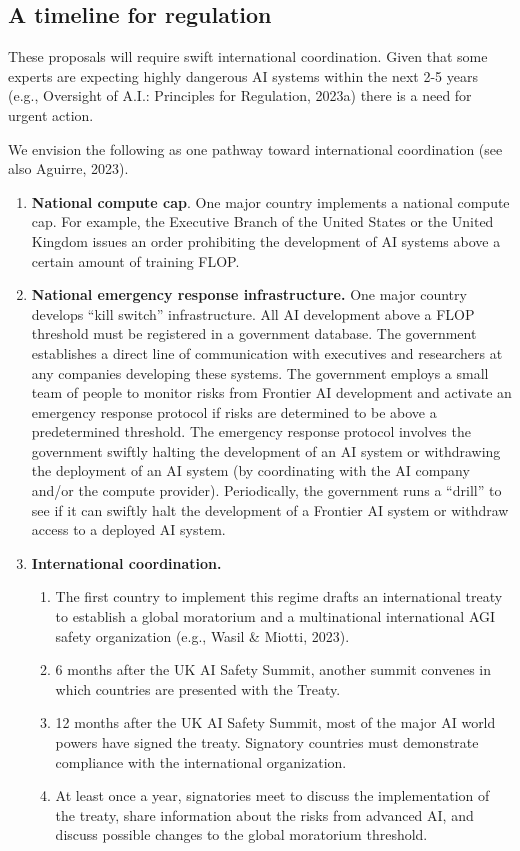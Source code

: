 \documentclass[12pt,a4paper]{article}
\begin{document}
\subsection{A timeline for regulation}

These proposals will require swift international coordination. Given that some experts are expecting highly dangerous AI systems within the next 2-5 years (e.g., Oversight of A.I.: Principles for Regulation, 2023a) there is a need for urgent action. 

We envision the following as one pathway toward international coordination (see also Aguirre, 2023). 

\begin{enumerate}
    \item \textbf{National compute cap}. One major country implements a national compute cap. For example, the Executive Branch of the United States or the United Kingdom issues an order prohibiting the development of AI systems above a certain amount of training FLOP. 
    \item \textbf{\textbf{National emergency response infrastructure}.} One major country develops “kill switch” infrastructure. All AI development above a FLOP threshold must be registered in a government database. The government establishes a direct line of communication with executives and researchers at any companies developing these systems. The government employs a small team of people to monitor risks from Frontier AI development and activate an emergency response protocol if risks are determined to be above a predetermined threshold. The emergency response protocol involves the government swiftly halting the development of an AI system or withdrawing the deployment of an AI system (by coordinating with the AI company and/or the compute provider). Periodically, the government runs a “drill” to see if it can swiftly halt the development of a Frontier AI system or withdraw access to a deployed AI system. 
    \item \textbf{\textbf{International coordination}.}
\begin{enumerate}
        \item The first country to implement this regime drafts an international treaty to establish a global moratorium and a multinational international AGI safety organization (e.g., Wasil \& Miotti, 2023).
        \item 6 months after the UK AI Safety Summit, another summit convenes in which countries are presented with the Treaty.
        \item 12 months after the UK AI Safety Summit, most of the major AI world powers have signed the treaty. Signatory countries must demonstrate compliance with the international organization. 
        \item At least once a year, signatories meet to discuss the implementation of the treaty, share information about the risks from advanced AI, and discuss possible changes to the global moratorium threshold.
\end{enumerate}

\end{enumerate}
\end{document}
